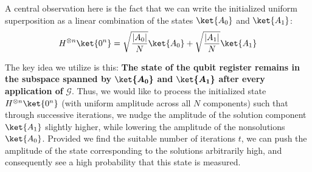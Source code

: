 A central observation here is the fact that we can write the initialized uniform superposition as a linear combination of the states $\ket{A_0}$
and $\ket{A_1}$:
\[H^{\otimes n} \ket{0^n} = \sqrt{\frac{|A_0|}{N}}\ket{A_0} + \sqrt{\frac{|A_1|}{N}}\ket{A_1}\]

The key idea we utilize is this: \textbf{The state of the qubit register remains in the subspace spanned by} $\boldsymbol{\ket{A_0}}$
\textbf{and} $\boldsymbol{\ket{A_1}}$ \textbf{after every application of} $\boldsymbol{\mathcal{G}}$. Thus, we would like to process the initialized state $H^{\otimes n} \ket{0^n}$ (with uniform amplitude across all $N$ components) such that through successive iterations, we nudge the amplitude of the solution component $\ket{A_1}$ slightly higher, while lowering the amplitude of the nonsolutions $\ket{A_0}$. %
Provided we find the suitable number of iterations $t$, we can push the amplitude of the state corresponding to the solutions arbitrarily high, and consequently see a high probability that this state is measured.

